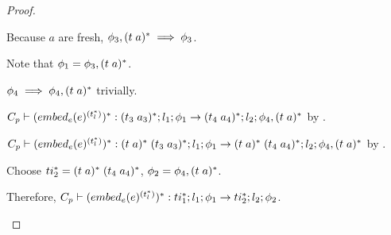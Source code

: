 \begin{proof}
\begin{enumerate}
        Because $a$ are fresh, $\phi_3,\ti{t}{a}^{*} \implies \phi_3$.

        Note that $\phi_1 = \phi_3,\ti{t}{a}^{*}$.


        $\phi_4 \implies \phi_4,\ti{t}{a}^{*}$ trivially.

        $C_p \vdash (\embed[e]{e}^{(t_l^{*})})^{*} : \ti{t_3}{a_3}^{*};l_1;\phi_1 \rightarrow \ti{t_4}{a_4}^{*};l_2;\phi_4,\ti{t}{a}^{*}$ by .

        $C_p \vdash (\embed[e]{e}^{(t_l^{*})})^{*} : \ti{t}{a}^{*}\; \ti{t_3}{a_3}^{*};l_1;\phi_1 \rightarrow \ti{t}{a}^{*}\; \ti{t_4}{a_4}^{*};l_2;\phi_4,\ti{t}{a}^{*}$ by .

        Choose $ti_2^{*} = \ti{t}{a}^{*}\; \ti{t_4}{a_4}^{*}$, $\phi_2 = \phi_4,\ti{t}{a}^{*}$.

        Therefore, $C_p \vdash (\embed[e]{e}^{(t_l^{*})})^{*} : ti_1^{*};l_1;\phi_1 \rightarrow ti_2^{*};l_2;\phi_2$.

    \end{enumerate}
\end{proof}

